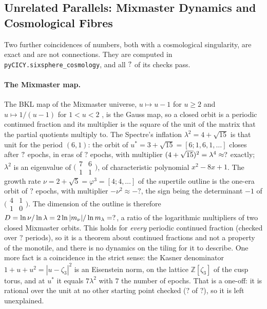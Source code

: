 \documentclass[11pt,a4paper]{article}
\newcommand{\SSCoEras}{?}\newcommand{\SSCoGridChecked}{?}\newcommand{\SSCoLevelsMissPercent}{?}
\newcommand{\SSCoNuMultNum}{?}\newcommand{\SSCoNuPeriod}{?}\newcommand{\SSCoOneOffStarts}{?}
\theoremstyle{plain}
\theoremstyle{definition}
\begin{document}
\subsection{Unrelated Parallels: Mixmaster Dynamics and Cosmological Fibres}
\label{sec:cosmo-nolink}

Two further coincidences of numbers, both with a cosmological singularity, are exact and
are not connections. They are computed in \texttt{pyCICY.sixsphere\_cosmology}, and all
$?{}$ of its checks pass.

\paragraph{The Mixmaster map.} The BKL map of the Mixmaster universe, $u\mapsto u-1$ for
$u\ge2$ and $u\mapsto1/(u-1)$ for $1<u<2$ \cite{BKL70}, is the Gauss map, so a closed orbit is a
periodic continued fraction and its multiplier is the square of the unit of the matrix
that the partial quotients multiply to. The Spectre's inflation $\lambda^2=4+\sqrt{15}$
is that unit for the period $(6,1)$: the orbit of $u^*=3+\sqrt{15}=[6;1,6,1,\dots]$ closes
after $?{}$ epochs, in eras of $\SSCoEras{}$ epochs, with multiplier
$(4+\sqrt{15})^2=\lambda^4\approx?$ exactly; $\lambda^2$ is an eigenvalue of
$\bigl(\begin{smallmatrix}7&6\\1&1\end{smallmatrix}\bigr)$, of characteristic polynomial $x^2-8x+1$.
The growth rate $\nu=2+\sqrt5=\varphi^3=[4;4,\dots]$ of the supertile outline is the one-era orbit
of $\SSCoNuPeriod{}$ epochs, with multiplier $-\nu^2\approx-\SSCoNuMultNum$, the sign being
the determinant $-1$ of $\bigl(\begin{smallmatrix}4&1\\1&0\end{smallmatrix}\bigr)$. The dimension of the
outline is therefore $D=\ln\nu/\ln\lambda=2\ln|m_\nu|/\ln m_\lambda=?$, a ratio of the
logarithmic multipliers of two closed Mixmaster orbits. This holds for \emph{every} periodic
continued fraction (checked over $\SSCoGridChecked{}$ periods), so it is a theorem about
continued fractions and not a property of the monotile, and there is no dynamics on the
tiling for it to describe. One more fact is a coincidence in the strict sense: the Kasner
denominator $1+u+u^2=|u-\zeta_3|^2$ is an Eisenstein norm, on the lattice $\mathbb Z[\zeta_3]$ of the
cusp torus, and at $u^*$ it equals $7\lambda^2$ with $7$ the number of epochs. That is a one-off:
it is rational over the unit at no other starting point checked ($\SSCoOneOffStarts{}$ of
$\SSCoOneOffStarts{}$), so it is left unexplained.
\end{document}
